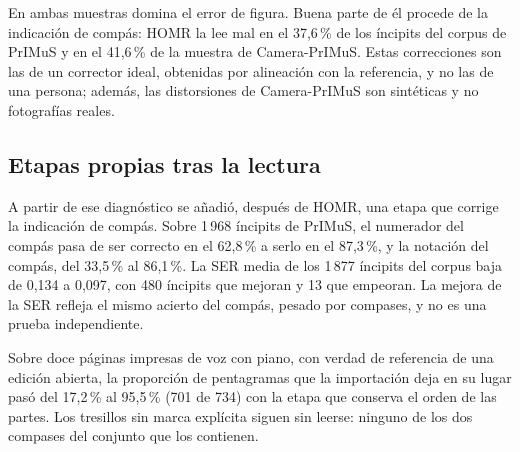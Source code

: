 \documentclass[conference]{IEEEtran}
\begin{document}
En ambas muestras domina el error de figura. Buena parte de él procede de
la indicación de compás: HOMR la lee mal en el 37,6\,\% de los íncipits
del corpus de PrIMuS y en el 41,6\,\% de la muestra de Camera-PrIMuS.
Estas correcciones son las de un corrector ideal, obtenidas por
alineación con la referencia, y no las de una persona; además, las
distorsiones de Camera-PrIMuS son sintéticas y no fotografías reales.

\subsection{Etapas propias tras la lectura}

A partir de ese diagnóstico se añadió, después de HOMR, una etapa que
corrige la indicación de compás. Sobre 1\,968 íncipits de PrIMuS, el
numerador del compás pasa de ser correcto en el 62,8\,\% a serlo en el
87,3\,\%, y la notación del compás, del 33,5\,\% al 86,1\,\%. La SER media
de los 1\,877 íncipits del corpus baja de 0,134 a 0,097, con 480 íncipits
que mejoran y 13 que empeoran.
La mejora de la SER refleja el mismo acierto del compás, pesado por
compases, y no es una prueba independiente.

Sobre doce páginas impresas de voz con piano, con verdad de referencia de
una edición abierta, la proporción de pentagramas que la importación deja
en su lugar pasó del 17,2\,\% al 95,5\,\% (701 de 734) con la etapa que
conserva el orden de las partes. Los tresillos sin marca explícita siguen
sin leerse: ninguno de los dos compases del conjunto que los contienen.
\end{document}
